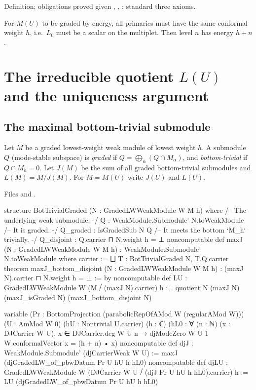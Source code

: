 \begin{status}
Definition; obligations proved given , , ; standard three axioms.
\end{status}

\begin{physics}
For $M(U)$ to be graded by energy, all primaries must have the same conformal weight $h$, i.e.\ $L_0$ must be a scalar on the
multiplet. Then level $n$ has energy $h+n$.
\end{physics}

\section{The irreducible quotient \texorpdfstring{$L(U)$}{L(U)} and the uniqueness argument}\label{l13:sec:LU}

\subsection{The maximal bottom-trivial submodule}

\begin{definition}[$J$ and $L = M/J$]\label{l13:def:maxJ}
Let $M$ be a graded lowest-weight weak module of lowest weight $h$. A submodule $Q$ (mode-stable subspace) is \emph{graded} if
$Q = \bigoplus_\alpha(Q\cap M_\alpha)$, and \emph{bottom-trivial} if $Q\cap M_h = 0$. Let $J(M)$ be the sum of all graded
bottom-trivial submodules and $L(M) = M/J(M)$. For $M = M(U)$ write $J(U)$ and $L(U)$.
\end{definition}
\noindent Files  and
.
\begin{leancode}
structure BotTrivialGraded (N : GradedLWWeakModule W M h) where
  /-- The underlying weak submodule. -/
  Q : WeakModule.Submodule' N.toWeakModule
  /-- It is graded. -/
  Q_graded : IsGradedSub N Q
  /-- It meets the bottom `M_h` trivially. -/
  Q_disjoint : Q.carrier ⊓ N.weight h = ⊥
noncomputable def maxJ (N : GradedLWWeakModule W M h) :
    WeakModule.Submodule' N.toWeakModule where
  carrier := ⨆ T : BotTrivialGraded N, T.Q.carrier
theorem maxJ_bottom_disjoint (N : GradedLWWeakModule W M h) :
    (maxJ N).carrier ⊓ N.weight h = ⊥ := by
noncomputable def LU : GradedLWWeakModule W (M ⧸ (maxJ N).carrier) h :=
  quotient N (maxJ N) (maxJ_isGraded N) (maxJ_bottom_disjoint N)

variable (Pr : BottomProjection (parabolicRepOfAMod W (regularAMod W))) (U : AmMod W 0)
  (hU : Nontrivial U.carrier) (h : ℂ)
  (hL0 : ∀ (n : ℕ) (x : DJCarrier W U), x ∈ DJCarrier.deg W U n →
    djModeZero W U 1 W.conformalVector x = (h + n) • x)
noncomputable def djJ : WeakModule.Submodule' (djCarrierWeak W U) :=
  maxJ (djGradedLW_of_pbwDatum Pr U hU h hL0)
noncomputable def djLU :
    GradedLWWeakModule W (DJCarrier W U ⧸ (djJ Pr U hU h hL0).carrier) h :=
  LU (djGradedLW_of_pbwDatum Pr U hU h hL0)
\end{leancode}

